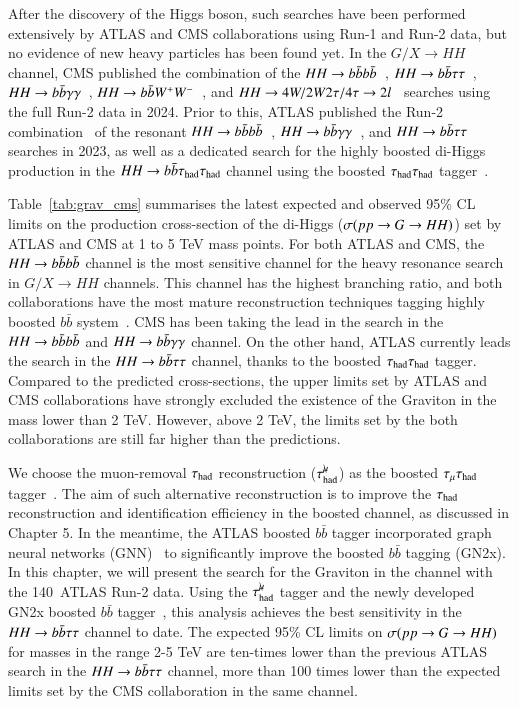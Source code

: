     After the discovery of the Higgs boson, such searches have been performed extensively by ATLAS and CMS collaborations using Run-1 and Run-2 data, 
    but no evidence of new heavy particles has been found yet.
    In the $G/X\rightarrow HH$ channel, CMS published the combination \cite{CMS-B2G-23-002} of the 
    $HH\rightarrow b\bar{b}b\bar{b}$~\cite{CMS-B2G-21-003}, 
    $HH\rightarrow b\bar{b}\tau\tau$~\cite{CMS-HIG-20-014}, 
    $HH\rightarrow b\bar{b}\gamma\gamma$~\cite{CMS-HIG-21-011}, 
    $HH\rightarrow b\bar{b}W^+W^-$~\cite{CMS-HIG-21-005, CMS-B2G-20-007}, and 
    $HH\rightarrow 4W / 2W2\tau / 4\tau \rightarrow 2l$~\cite{CMS-HIG-21-002} searches using the full Run-2 data in 2024. 
    Prior to this, ATLAS published the Run-2 combination~\cite{HDBS-2023-17} of the resonant
    $HH\rightarrow b\bar{b}b\bar{b}$~\cite{HDBS-2018-41}, 
    $HH\rightarrow b\bar{b}\gamma\gamma$~\cite{HDBS-2018-34}, and 
    $HH\rightarrow b\bar{b}\tau\tau$~\cite{HDBS-2018-40} searches in 2023, as well as a dedicated search for the highly boosted di-Higgs production in the $HH\rightarrow b\bar{b}\tau_{\text{had}}\tau_{\text{had}}$ channel 
    using the boosted $\tau_{\text{had}}\tau_{\text{had}}$ tagger~\cite{HDBS-2019-22}.
    
    Table~\ref{tab:grav_cms} summarises the latest expected and observed 95\% CL limits on the production cross-section 
    of the di-Higgs ($\sigma(pp\rightarrow G \rightarrow HH)$) set by ATLAS and CMS at 1 to 5 TeV mass points.  
    For both ATLAS and CMS, the $HH\rightarrow b\bar{b}b\bar{b}$ channel is the most sensitive channel for the heavy resonance search in $G/X\rightarrow HH$ channels. This channel 
    has the highest branching ratio, and both collaborations have the most mature reconstruction techniques tagging highly boosted $b\bar{b}$ system~\cite{PERF-2017-04, CMS-DP-2020-002}.
    CMS has been taking the lead in the search in the $HH\rightarrow b\bar{b}b\bar{b}$ and $HH\rightarrow b\bar{b}\gamma\gamma$ channel. On the other hand, ATLAS currently leads the search in the $HH\rightarrow b\bar{b}\tau\tau$ channel, 
    thanks to the boosted $\tau_{\text{had}}\tau_{\text{had}}$ tagger. 
    Compared to the predicted cross-sections, the upper limits set by 
    ATLAS and CMS collaborations have strongly excluded the existence of the Graviton 
    in the mass lower than 2 TeV. However, above 2 TeV, the limits set by the 
    both collaborations are still far higher than the predictions.

    We choose the muon-removal $\tau_{\text{had}}$ reconstruction ($\tau_\mathrm{had}^{\mu\mkern-10mu\backslash}$) as the boosted $\tau_\mathrm{\mu}\tau_\mathrm{had}$ tagger~\cite{Dong:2890038, Dong:2899443}. 
    The aim of such alternative reconstruction is to improve the $\tau_{\text{had}}$ reconstruction and identification efficiency in the boosted \tmth channel, as discussed in Chapter 5.
    In the meantime, the ATLAS boosted $b\bar{b}$ tagger incorporated graph neural networks (GNN)~\cite{ATL-PHYS-PUB-2023-021} 
    to significantly improve the boosted $b\bar{b}$ tagging (GN2x).
    In this chapter, we will present the search for the Graviton 
    in the \hhbbtmth channel with the 140~\ifb ATLAS Run-2 data. Using the $\tau_\mathrm{had}^{\mu\mkern-10mu\backslash}$ tagger and the newly developed GN2x boosted $b\bar{b}$ tagger~\cite{ATL-PHYS-PUB-2023-021},
    this analysis achieves the best sensitivity in the $HH\rightarrow b\bar{b}\tau\tau$ channel to date. The expected
    95\% CL limits on $\sigma(pp\rightarrow G \rightarrow HH)$ for masses in the range 2-5 TeV are ten-times lower than the previous ATLAS search in the $HH\rightarrow b\bar{b}\tau\tau$ channel, more than 100 times lower than the
    expected limits set by the CMS collaboration in the same channel. 


